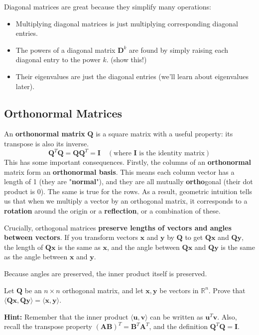 \documentclass[11pt]{article}
\begin{document}
Diagonal matrices are great because they simplify many operations:
\begin{itemize}
    \item Multiplying diagonal matrices is just multiplying corresponding diagonal entries.
    \item The powers of a diagonal matrix $\mathbf{D}^k$ are found by simply raising each diagonal entry to the power $k$. (show this!)
    \item Their eigenvalues are just the diagonal entries (we'll learn about eigenvalues later).
\end{itemize}

\subsection{Orthonormal Matrices}
An \textbf{orthonormal matrix} $\mathbf{Q}$ is a square matrix with a useful property: its transpose is also its inverse.
\[ \mathbf{Q}^T\mathbf{Q} = \mathbf{Q}\mathbf{Q}^T = \mathbf{I} \quad (\text{where } \mathbf{I} \text{ is the identity matrix}) \]
This has some important consequences. Firstly, the columns of an \textbf{orthonormal} matrix form an \textbf{orthonormal basis}. This means each column vector has a length of 1 (they are "\textbf{normal}"), and they are all mutually \textbf{ortho}gonal (their dot product is 0). The same is true for the rows. As a result, geometric intuition tells us that when we multiply a vector by an orthogonal matrix, it corresponds to a \textbf{rotation} around the origin or a \textbf{reflection}, or a combination of these.

Crucially, orthogonal matrices \textbf{preserve lengths of vectors and angles between vectors}. If you transform vectors $\mathbf{x}$ and $\mathbf{y}$ by $\mathbf{Q}$ to get $\mathbf{Qx}$ and $\mathbf{Qy}$, the length of $\mathbf{Qx}$ is the same as $\mathbf{x}$, and the angle between $\mathbf{Qx}$ and $\mathbf{Qy}$ is the same as the angle between $\mathbf{x}$ and $\mathbf{y}$.

Because angles are preserved, the inner product itself is preserved.

\begin{exercise}
    Let $\mathbf{Q}$ be an $n \times n$ orthogonal matrix, and let $\mathbf{x}, \mathbf{y}$ be vectors in $\mathbb{R}^n$.
Prove that $\langle \mathbf{Qx}, \mathbf{Qy} \rangle = \langle \mathbf{x}, \mathbf{y} \rangle$.

\textbf{Hint:} Remember that the inner product $\langle \mathbf{u}, \mathbf{v} \rangle$ can be written as $\mathbf{u}^T \mathbf{v}$. Also, recall the transpose property $(\mathbf{A}\mathbf{B})^T = \mathbf{B}^T\mathbf{A}^T$, and the definition $\mathbf{Q}^T\mathbf{Q} = \mathbf{I}$.
\end{exercise}
\end{document}

